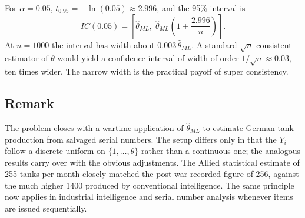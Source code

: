 For $\alpha = 0.05$, $t_{0.95} = -\ln(0.05) \approx 2.996$, and the 95\% interval is
\[
IC(0.05) = \left[\widehat\theta_{ML},\; \widehat\theta_{ML}\left(1 + \frac{2.996}{n}\right)\right].
\]
At $n = 1000$ the interval has width about $0.003\, \widehat\theta_{ML}$. A standard $\sqrt n$ consistent estimator of $\theta$ would yield a confidence interval of width of order $1/\sqrt n \approx 0.03$, ten times wider. The narrow width is the practical payoff of super consistency.

\subsection*{Remark}

The problem closes with a wartime application of $\widehat\theta_{ML}$ to estimate German tank production from salvaged serial numbers. The setup differs only in that the $Y_i$ follow a discrete uniform on $\{1, \dots, \theta\}$ rather than a continuous one; the analogous results carry over with the obvious adjustments. The Allied statistical estimate of 255 tanks per month closely matched the post war recorded figure of 256, against the much higher 1400 produced by conventional intelligence. The same principle now applies in industrial intelligence and serial number analysis whenever items are issued sequentially.
